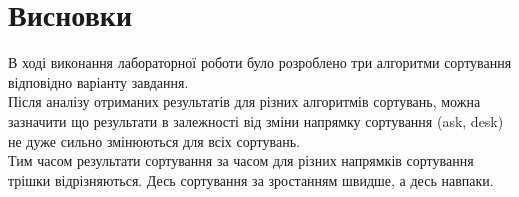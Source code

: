 \clearpage
\section{Висновки}
В ході виконання лабораторної роботи було розроблено три алгоритми сортування відповідно варіанту завдання.\\

Після аналізу отриманих результатів для різних алгоритмів сортувань, можна зазначити що результати в залежності від зміни напрямку сортування (ask, desk) не дуже сильно змінюються для всіх сортувань.\\

Тим часом результати сортування за часом для різних напрямків сортування трішки відрізняються. Десь сортування за зростанням швидше, а десь навпаки.





